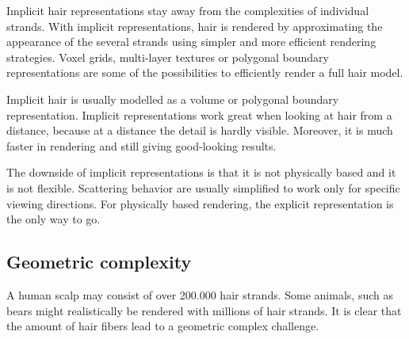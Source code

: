 \documentclass[11pt,a4paper]{report}
\begin{document}
Implicit hair representations stay away from the complexities of individual strands. With implicit representations, hair is rendered by approximating the appearance of the several strands using simpler and more efficient rendering strategies. Voxel grids, multi-layer textures or polygonal boundary representations are some of the possibilities to efficiently render a full hair model.

Implicit hair is usually modelled as a volume or polygonal boundary representation. Implicit representations work great when looking at hair from a distance, because at a distance the detail is hardly visible. Moreover, it is much faster in rendering and still giving good-looking results.









The downside of implicit representations is that it is not physically based and it is not flexible. Scattering behavior are usually simplified to work only for specific viewing directions. For physically based rendering, the explicit representation is the only way to go.

\subsection{Geometric complexity}

A human scalp may consist of over 200.000 hair strands. Some animals, such as bears might realistically be rendered with millions of hair strands. It is clear that the amount of hair fibers lead to a geometric complex challenge. 
\end{document}
